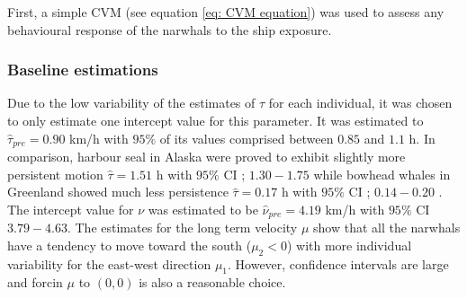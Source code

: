 \documentclass[11pt]{article}
\newcommand {\1}{\mathbb{1}}
\begin{document}
First, a simple CVM (see equation \ref{eq: CVM equation}) was used to assess any behavioural response of the narwhals to the ship exposure.

\subsubsection{Baseline estimations}
Due to the low variability of the estimates of $\tau$ for each individual, it was chosen to only estimate one intercept value for this parameter. It was estimated to $\hat{\tau}_{pre}=0.90 $ km/h with $95 \%$ of its values comprised between $0.85$ and $1.1$ h.
In comparison, harbour seal in Alaska were proved to exhibit slightly more persistent motion $\hat{\tau}=1.51$ h with $95\%$ CI ; $1.30 -1.75$  \cite{johnson_continuous_2008} while bowhead whales in Greenland showed much less persistence $\hat{\tau}=0.17$ h with $95\%$ CI ; $0.14 -0.20$  \cite{gurarie_correlated_2017}.
The intercept value for $\nu$ was estimated to be $\hat{\nu}_{pre}=4.19$ km/h with $95\%$ CI $3.79-4.63$.
The estimates for the long term velocity $\mu$ show that all the narwhals have a tendency to move toward the south ($\mu_2<0$) with more individual variability for the east-west direction $\mu_1$. However, confidence intervals are large and  forcin $\mu$ to $(0,0)$ is also a reasonable choice.
\end{document}
